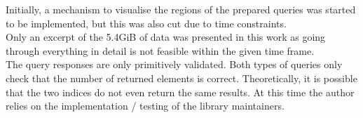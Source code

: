 Initially, a mechanism to visualise the regions of the prepared queries was started to be implemented, but this was also cut due to time constraints.\\

Only an excerpt of the 5.4GiB of data was presented in this work as going through everything in detail is not feasible within the given time frame.\\

The query responses are only primitively validated. Both types of queries only check that the number of returned elements is correct. Theoretically, it is possible that the two indices do not even return the same results. At this time the author relies on the implementation / testing of the library maintainers.